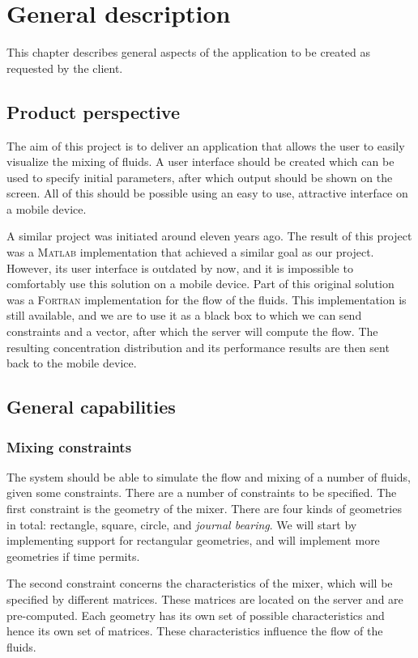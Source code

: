 \chapter{General description}
This chapter describes general aspects of the application to be created as requested by the client.

\section{Product perspective}
The aim of this project is to deliver an application that allows the user to easily visualize the mixing of fluids. A user interface should be created which can be used to specify initial parameters, after which output should be shown on the screen. All of this should be possible using an easy to use, attractive interface on a mobile device.

A similar project was initiated around eleven years ago. The result of this project was a \textsc{Matlab} implementation that achieved a similar goal as our project. However, its user interface is outdated by now, and it is impossible to comfortably use this solution on a mobile device. Part of this original solution was a \textsc{Fortran} implementation for the flow of the fluids. This implementation is still available, and we are to use it as a black box to which we can send constraints and a vector, after which the server will compute the flow. The resulting concentration distribution and its performance results are then sent back to the mobile device.

\section{General capabilities}
\subsection{Mixing constraints}
The system should be able to simulate the flow and mixing of a number of fluids, given some constraints. There are a number of constraints to be specified. The first constraint is the geometry of the mixer. There are four kinds of geometries in total: rectangle, square, circle, and \emph{journal bearing}. We will start by implementing support for rectangular geometries, and will implement more geometries if time permits.
 
The second constraint concerns the characteristics of the mixer, which will be specified by different matrices. These matrices are located on the server and are pre-computed. Each geometry has its own set of possible characteristics and hence its own set of matrices. These characteristics influence the flow of the fluids.

